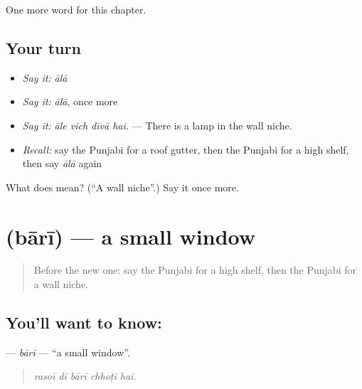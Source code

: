 \begin{grammarlens}[title={What you've built}]
One more word for this chapter.
\end{grammarlens}

\subsection*{Your turn}
\begin{itemize}
\raggedright
  \item \emph{Say it:} \emph{ālā}
  \item \emph{Say it:} \emph{ālā}, once more
  \item \emph{Say it:} \emph{āle vich dīvā hai.} — There is a lamp in the wall niche.
  \item \emph{Recall:} say the Punjabi for a roof gutter, then the Punjabi for a high shelf, then say \emph{ālā} again
\end{itemize}

\begin{tcolorbox}[breakable,colback=teal!4,colframe=teal!35!black,title={Before you move on}]
What does  mean? (\textquotedblleft{}A wall niche\textquotedblright{}.) Say it once more.
\end{tcolorbox}
\section[\texorpdfstring{\pa{ਬਾਰੀ} (bārī)}{ਬਾਰੀ (bārī)}]{ (bārī) — a small window}

\label{lesson:PA-C247-bari}



\begin{quote}
Before the new one: say the Punjabi for a high shelf, then the Punjabi for a wall niche.
\end{quote}

\subsection*{You'll want to know: }
\textbf{} — \emph{bārī} — \textquotedblleft{}a small window\textquotedblright{}.

\begin{quote}
    
\end{quote}

\begin{quote}
\emph{rasoī dī bārī chhoṭī hai.}
\end{quote}

